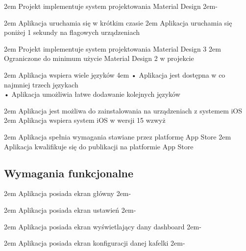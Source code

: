 {2em}{
    Projekt implementuje system projektowania Material Design
}
{2em}{-}

{2em}{
    Aplikacja uruchamia się w krótkim czasie
}
{2em}{
    Aplikacja uruchamia się poniżej 1 sekundy na flagowych urządzeniach
}

{2em}{
    Projekt implementuje system projektowania Material Design 3
}
{2em}{
    Ograniczone do minimum użycie Material Design 2 w projekcie
}

{2em}{
    Aplikacja wspiera wiele języków
}
{4em}{
    • Aplikacja jest dostępna w co najmniej trzech językach\\
    • Aplikacja umożliwia łatwe dodawanie kolejnych języków
}

{2em}{
    Aplikacja jest możliwa do zainstalowania na urządzeniach z systemem iOS
}
{2em}{
    Aplikacja wspiera system iOS w wersji 15 wzwyż
}

{2em}{
    Aplikacja spełnia wymagania stawiane przez platformę App Store
}
{2em}{
    Aplikacja kwalifikuje się do publikacji na platformie App Store
}

\newpage

\subsection{Wymagania funkcjonalne}{}

{2em}{
    Aplikacja posiada ekran główny
}
{2em}{-}

{2em}{
    Aplikacja posiada ekran ustawień
}
{2em}{-}

{2em}{
    Aplikacja posiada ekran wyświetlający dany dashboard
}
{2em}{-}

{2em}{
    Aplikacja posiada ekran konfiguracji danej kafelki
}
{2em}{-}

